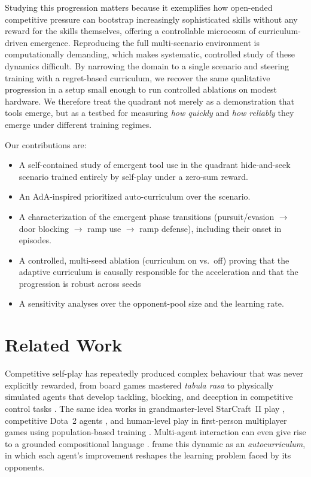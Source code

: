 \documentclass{article}
\begin{document}
Studying this progression matters because it exemplifies how open-ended
competitive pressure can bootstrap increasingly sophisticated skills without any
reward for the skills themselves, offering a controllable microcosm of
curriculum-driven emergence. Reproducing the full multi-scenario environment is
computationally demanding, which makes systematic, controlled study of these
dynamics difficult. By narrowing the domain to a single scenario and steering
training with a regret-based curriculum, we recover the same qualitative
progression in a setup small enough to run controlled ablations on modest
hardware. We therefore treat the quadrant not merely as a demonstration that
tools emerge, but as a testbed for measuring \emph{how quickly} and \emph{how
reliably} they emerge under different training regimes.

Our contributions are:
\begin{itemize}
  \item A self-contained study of emergent tool use in the quadrant
  hide-and-seek scenario trained entirely by self-play under a zero-sum reward.
  \item An AdA-inspired \citep{ada2023} prioritized auto-curriculum over the scenario.
  \item A characterization of the emergent phase transitions
  (pursuit/evasion $\rightarrow$ door blocking $\rightarrow$ ramp use
  $\rightarrow$ ramp defense), including their onset in episodes.
  \item A controlled, multi-seed ablation (curriculum on vs.\ off) proving
  that the adaptive curriculum is causally responsible for the acceleration and
  that the progression is robust across seeds
  \item A sensitivity analyses over the opponent-pool size and the learning rate.
\end{itemize}


\section{Related Work}
\label{sec:related}

Competitive self-play has repeatedly produced complex behaviour that was never
explicitly rewarded, from board games mastered \emph{tabula rasa}
\citep{silver2018general} to physically simulated agents that develop tackling,
blocking, and deception in competitive control tasks \citep{bansal2018emergent}.
The same idea works in grandmaster-level StarCraft~II play
\citep{vinyals2019alphastar}, competitive Dota~2 agents \citep{berner2019dota},
and human-level play in first-person multiplayer games using population-based
training \citep{jaderberg2019ctf}. Multi-agent interaction can even give rise to a
grounded compositional language \citep{mordatch2018emergence}.
\citet{leibo2019autocurricula} frame this dynamic as an \emph{autocurriculum}, in
which each agent's improvement reshapes the learning problem faced by its
opponents.
\end{document}
